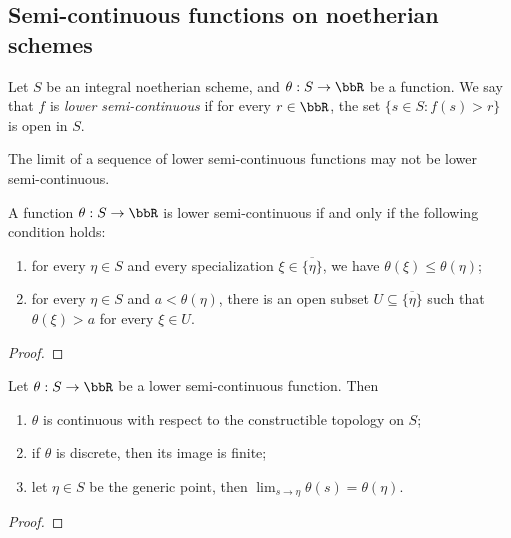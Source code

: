 \subsection{Semi-continuous functions on noetherian schemes}

Let $S$ be an integral noetherian scheme, and $\theta: S \to \bbR$ be a function.
We say that $f$ is \emph{lower semi-continuous} if for every $r \in \bbR$, the set $\{ s \in S : f(s) > r \}$ is open in $S$.

\begin{remark}
	The limit of a sequence of lower semi-continuous functions may not be lower semi-continuous.
	\Yang{}
\end{remark}

\begin{lemma}\label{lem:characterization_of_lower_semi-continuous_functions_on_noetherian_schemes}
	A function $\theta: S \to \bbR$ is lower semi-continuous if and only if the following condition holds:
	\begin{enumerate}
		\item for every $\eta \in S$ and every specialization $\xi \in \overline{\{\eta\}}$, we have $\theta(\xi) \leq \theta(\eta)$;
		\item for every $\eta \in S$ and $a < \theta(\eta)$, there is an open subset $U \subseteq \overline{\{\eta\}}$ such that $\theta(\xi) > a$ for every $\xi \in U$.
	\end{enumerate}
\end{lemma}
\begin{proof}
	\Yang{}
\end{proof}


\begin{lemma}\label{lem:properties_of_lower_semi-continuous_functions_on_noetherian_schemes}
	Let $\theta: S \to \bbR$ be a lower semi-continuous function.
	Then
	\begin{enumerate}
		\item $\theta$ is continuous with respect to the constructible topology on $S$;
		\item if $\theta$ is discrete, then its image is finite;
		\item let $\eta \in S$ be the generic point, then $\lim_{s \to \eta} \theta(s) = \theta(\eta)$.
	\end{enumerate}
\end{lemma}
\begin{proof}
	\Yang{}
\end{proof}




